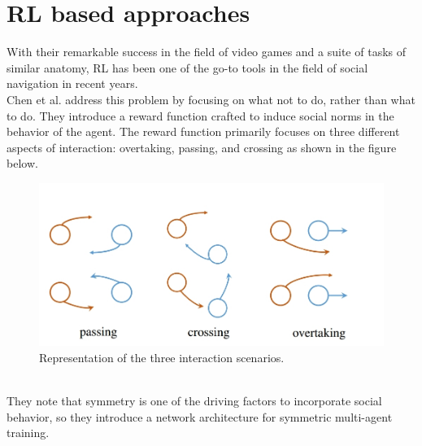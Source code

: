 \section{RL based approaches}
 With their remarkable success in the field of video games and a suite of tasks of similar anatomy, RL has been one of the go-to tools in the field of social navigation in recent years. \\
Chen et al. \cite{chen_socially_2017} address this problem by focusing on what not to do, rather than what to do. They introduce a reward function crafted to induce social norms in the behavior of the agent. The reward function primarily focuses on three different aspects of interaction: overtaking, passing, and crossing as shown in the figure below.
 \begin{figure}[!htbp]
     \centering
    \includegraphics[width=.6\linewidth]{figures/chapter2_rl_based_approach}
    \caption{Representation of the three interaction scenarios.}
    \label{fig:label1}
 \end{figure}
\\
They note that symmetry is one of the driving factors to incorporate social behavior, so they introduce a network architecture for symmetric multi-agent training.\\

